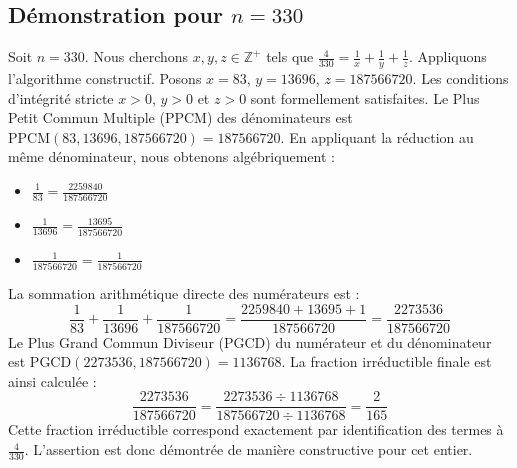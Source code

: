 \documentclass[11pt,a4paper]{article}
\begin{document}
\subsection{Démonstration pour $n = 330$}
Soit $n = 330$. Nous cherchons $x, y, z \in \mathbb{Z}^{+}$ tels que $\frac{4}{330} = \frac{1}{x} + \frac{1}{y} + \frac{1}{z}$.
Appliquons l'algorithme constructif. Posons $x = 83$, $y = 13696$, $z = 187566720$.
Les conditions d'intégrité stricte $x > 0$, $y > 0$ et $z > 0$ sont formellement satisfaites.
Le Plus Petit Commun Multiple (PPCM) des dénominateurs est $\text{PPCM}(83, 13696, 187566720) = 187566720$.
En appliquant la réduction au même dénominateur, nous obtenons algébriquement :
\begin{itemize}
    \item $\frac{1}{83} = \frac{2259840}{187566720}$
    \item $\frac{1}{13696} = \frac{13695}{187566720}$
    \item $\frac{1}{187566720} = \frac{1}{187566720}$
\end{itemize}
La sommation arithmétique directe des numérateurs est :
$$ \frac{1}{83} + \frac{1}{13696} + \frac{1}{187566720} = \frac{2259840 + 13695 + 1}{187566720} = \frac{2273536}{187566720} $$
Le Plus Grand Commun Diviseur (PGCD) du numérateur et du dénominateur est $\text{PGCD}(2273536, 187566720) = 1136768$.
La fraction irréductible finale est ainsi calculée :
$$ \frac{2273536}{187566720} = \frac{2273536 \div 1136768}{187566720 \div 1136768} = \frac{2}{165} $$
Cette fraction irréductible correspond exactement par identification des termes à $\frac{4}{330}$. L'assertion est donc démontrée de manière constructive pour cet entier.
\end{document}
